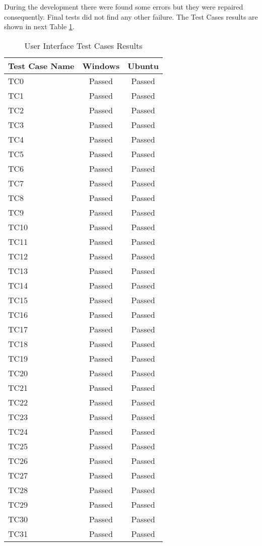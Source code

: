 During the development there were found some errors but they were repaired consequently. Final tests did not find any other failure. The Test Cases results are shown in next Table \ref{tab:UITCResults}.

\begin{table}[!ht]
\begin{center}
\begin{tabular}{|l|c|c|}
	\hline
	{ \bf Test Case Name } & { \bf Windows } & { \bf Ubuntu } \\
	\hline \hline
	TC0      & Passed & Passed  \\
	TC1      & Passed & Passed  \\
   TC2      & Passed & Passed  \\
   TC3      & Passed & Passed  \\
   TC4      & Passed & Passed  \\
   TC5      & Passed & Passed  \\
   TC6      & Passed & Passed  \\
   TC7      & Passed & Passed  \\
   TC8      & Passed & Passed  \\
   TC9      & Passed & Passed  \\
   TC10     & Passed & Passed  \\
   TC11     & Passed & Passed  \\
   TC12     & Passed & Passed  \\
   TC13     & Passed & Passed  \\
   TC14     & Passed & Passed  \\
   TC15     & Passed & Passed  \\
   TC16     & Passed & Passed  \\
   TC17     & Passed & Passed  \\
   TC18     & Passed & Passed  \\
   TC19     & Passed & Passed  \\
   TC20     & Passed & Passed  \\
   TC21     & Passed & Passed  \\
   TC22     & Passed & Passed  \\
   TC23     & Passed & Passed  \\
   TC24     & Passed & Passed  \\
   TC25     & Passed & Passed  \\
   TC26     & Passed & Passed  \\
   TC27     & Passed & Passed  \\
   TC28     & Passed & Passed  \\
   TC29     & Passed & Passed  \\
   TC30     & Passed & Passed  \\
   TC31     & Passed & Passed  \\
	\hline
\end{tabular}
\caption{User Interface Test Cases Results}
\label{tab:UITCResults}
\end{center}
\end{table}
